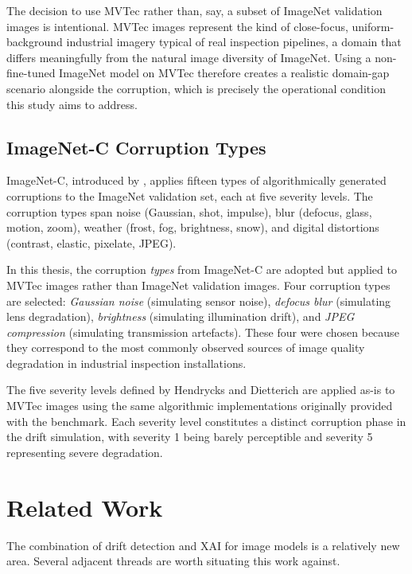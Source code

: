 The decision to use MVTec rather than, say, a subset of ImageNet validation images is intentional. MVTec images represent the kind of close-focus, uniform-background industrial imagery typical of real inspection pipelines, a domain that differs meaningfully from the natural image diversity of ImageNet. Using a non-fine-tuned ImageNet model on MVTec therefore creates a realistic domain-gap scenario alongside the corruption, which is precisely the operational condition this study aims to address.

\subsection{ImageNet-C Corruption Types}

ImageNet-C, introduced by \textcite{Hendrycks2019}, applies fifteen types of algorithmically generated corruptions to the ImageNet validation set, each at five severity levels. The corruption types span noise (Gaussian, shot, impulse), blur (defocus, glass, motion, zoom), weather (frost, fog, brightness, snow), and digital distortions (contrast, elastic, pixelate, JPEG).

In this thesis, the corruption \textit{types} from ImageNet-C are adopted but applied to MVTec images rather than ImageNet validation images. Four corruption types are selected: \textit{Gaussian noise} (simulating sensor noise), \textit{defocus blur} (simulating lens degradation), \textit{brightness} (simulating illumination drift), and \textit{JPEG compression} (simulating transmission artefacts). These four were chosen because they correspond to the most commonly observed sources of image quality degradation in industrial inspection installations.

The five severity levels defined by Hendrycks and Dietterich are applied as-is to MVTec images using the same algorithmic implementations originally provided with the benchmark. Each severity level constitutes a distinct corruption phase in the drift simulation, with severity 1 being barely perceptible and severity 5 representing severe degradation.

\section{Related Work}
\label{sec:relatedwork}

The combination of drift detection and XAI for image models is a relatively new area. Several adjacent threads are worth situating this work against.

